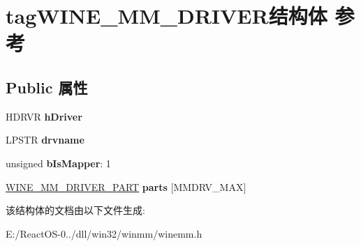\hypertarget{structtag_w_i_n_e___m_m___d_r_i_v_e_r}{}\section{tag\+W\+I\+N\+E\+\_\+\+M\+M\+\_\+\+D\+R\+I\+V\+E\+R结构体 参考}
\label{structtag_w_i_n_e___m_m___d_r_i_v_e_r}
\subsection*{Public 属性}
\begin{DoxyCompactItemize}
\item 
\mbox{\label{structtag_w_i_n_e___m_m___d_r_i_v_e_r_ae53ff6b1b71ffccc43b8c0c23f313025}} 
H\+D\+R\+VR {\bfseries h\+Driver}
\item 
\mbox{\label{structtag_w_i_n_e___m_m___d_r_i_v_e_r_ab6f68332b53b3225497bba5954f23177}} 
L\+P\+S\+TR {\bfseries drvname}
\item 
\mbox{\label{structtag_w_i_n_e___m_m___d_r_i_v_e_r_ab9fd33aae94df2534db79cddb017ce40}} 
unsigned {\bfseries b\+Is\+Mapper}\+: 1
\item 
\mbox{\label{structtag_w_i_n_e___m_m___d_r_i_v_e_r_a1ead9439eb3eec2f3a2211b8a543b165}} 
\hyperlink{structtag_w_i_n_e___m_m___d_r_i_v_e_r___p_a_r_t}{W\+I\+N\+E\+\_\+\+M\+M\+\_\+\+D\+R\+I\+V\+E\+R\+\_\+\+P\+A\+RT} {\bfseries parts} \mbox{[}M\+M\+D\+R\+V\+\_\+\+M\+AX\mbox{]}
\end{DoxyCompactItemize}


该结构体的文档由以下文件生成\+:\begin{DoxyCompactItemize}
\item 
E\+:/\+React\+O\+S-\/0../dll/win32/winmm/winemm.\+h\end{DoxyCompactItemize}
